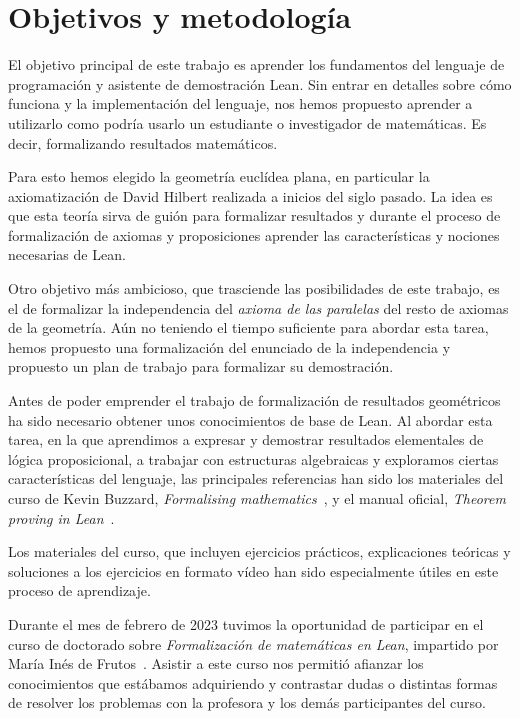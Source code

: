 \section{Objetivos y metodolog\'{i}a}

El objetivo principal de este trabajo es aprender los fundamentos del lenguaje
de programación y asistente de demostración Lean. Sin entrar en
detalles sobre cómo funciona y la implementación del lenguaje, nos hemos
propuesto aprender a utilizarlo como podría usarlo un estudiante o investigador de
matemáticas. Es decir, formalizando resultados matemáticos.

Para esto hemos elegido la geometría euclídea plana, en particular la
axiomatización de David Hilbert realizada a inicios del siglo pasado.
La idea es que esta teoría sirva de guión para formalizar resultados y durante
el proceso de formalización de axiomas y proposiciones aprender las
características y nociones necesarias de Lean.

Otro objetivo más ambicioso, que trasciende las posibilidades de este trabajo,
es el de formalizar la independencia del \textit{axioma de las paralelas} del
resto de axiomas de la geometría. Aún no teniendo el tiempo suficiente para
abordar esta tarea, hemos propuesto una formalización del enunciado de la
independencia y propuesto un plan de trabajo para formalizar su demostración.

Antes de poder emprender el trabajo de formalización de resultados geométricos
ha sido necesario obtener unos conocimientos de base de Lean. Al abordar esta
tarea, en la que aprendimos a expresar y demostrar resultados elementales de
lógica proposicional, a trabajar con estructuras algebraicas y exploramos
ciertas características del lenguaje, las principales referencias han sido los
materiales del curso de Kevin Buzzard, \textit{Formalising
	mathematics}~\cite{buzzardFormalisingMathematicsFormalising}, y el manual
oficial, \textit{Theorem proving in Lean}~\cite{avigadLeanTheoremProver}.

Los materiales del curso, que incluyen ejercicios prácticos, explicaciones
teóricas y soluciones a los ejercicios en formato vídeo han sido especialmente
útiles en este proceso de aprendizaje.

Durante el mes de febrero de 2023 tuvimos la oportunidad de participar en el
curso de doctorado sobre \textit{Formalización de matemáticas en Lean},
impartido por María Inés de Frutos~\cite{defrutosFormalizacionMatematicasLean}.
Asistir a este curso nos permitió afianzar los conocimientos que estábamos
adquiriendo y contrastar dudas o distintas formas de resolver los problemas con
la profesora y los demás participantes del curso.

